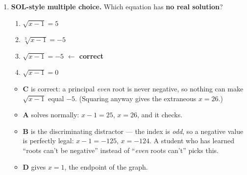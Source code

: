 \documentclass[10pt]{article}
\begin{document}
\begin{enumerate}[leftmargin=1.8em, itemsep=10pt]
  \item \textbf{SOL-style multiple choice.} Which equation has \textbf{no real solution}?
        \begin{enumerate}[label=\Alph*., leftmargin=1.9em, itemsep=1pt]
          \item $\sqrt{x-1}=5$
          \item $\sqrt[3]{x-1}=-5$
          \item $\sqrt{x-1}=-5$ \quad \textcolor{keyred}{\textbf{$\leftarrow$ correct}}
          \item $\sqrt{x-1}=0$
        \end{enumerate}
        \vspace{2pt}
        \begin{itemize}[leftmargin=1.4em, nosep]
          \item \textbf{C} is correct: a principal \emph{even} root is never negative, so nothing
                can make $\sqrt{x-1}$ equal $-5$. (Squaring anyway gives the extraneous $x=26$.)
          \item \textbf{A} solves normally: $x-1=25$, $x=26$, and it checks.
          \item \textbf{B} is the discriminating distractor --- the index is \emph{odd}, so a
                negative value is perfectly legal: $x-1=-125$, $x=-124$. A student who has learned
                ``roots can't be negative'' instead of ``\emph{even} roots can't'' picks this.
          \item \textbf{D} gives $x=1$, the endpoint of the graph.
        \end{itemize}
\end{enumerate}
\end{document}
